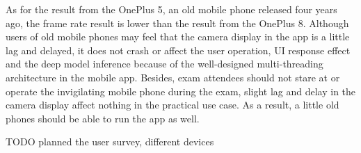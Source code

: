 As for the result from the OnePlus 5, an old mobile phone released four years ago, the frame rate result is lower than the result from the OnePlus 8.
Although users of old mobile phones may feel that the camera display in the app is a little lag and delayed, it does not crash or affect the user operation, UI response effect and the deep model inference because of the well-designed multi-threading architecture in the mobile app.
Besides, exam attendees should not stare at or operate the invigilating mobile phone during the exam, slight lag and delay in the camera display affect nothing in the practical use case.
As a result, a little old phones should be able to run the app as well.

TODO planned the user survey, different devices